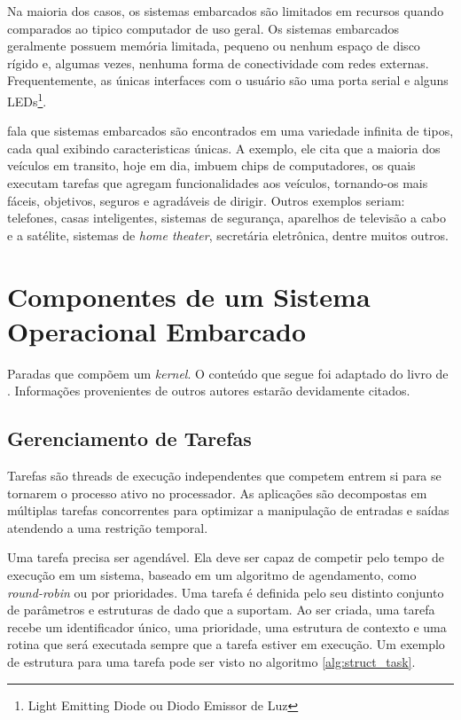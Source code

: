Na maioria dos casos, os sistemas embarcados são limitados em recursos quando comparados ao tipico computador de uso geral. Os sistemas embarcados geralmente possuem memória limitada, pequeno ou nenhum espaço de disco rígido e, algumas vezes, nenhuma forma de conectividade com redes externas. Frequentemente, as únicas interfaces com o usuário são uma porta serial e alguns LEDs\footnote{Light Emitting Diode ou Diodo Emissor de Luz}\cite{hallinan}.

 fala que sistemas embarcados são encontrados em uma variedade infinita de tipos, cada qual exibindo caracteristicas únicas. A exemplo, ele cita que a maioria dos veículos em transito, hoje em dia, imbuem chips de computadores, os quais executam tarefas que agregam funcionalidades aos veículos, tornando-os mais fáceis, objetivos, seguros e agradáveis de dirigir. Outros exemplos seriam: telefones, casas inteligentes, sistemas de segurança, aparelhos de televisão a cabo e a satélite, sistemas de \emph{home theater}, secretária eletrônica, dentre muitos outros.

\section{Componentes de um Sistema Operacional Embarcado}

Paradas que compõem um \emph{kernel}. O conteúdo que segue foi adaptado do livro de . Informações provenientes de outros autores estarão devidamente citados.

\subsection{Gerenciamento de Tarefas}

Tarefas são threads de execução independentes que competem entrem si para se tornarem o processo ativo no processador. As aplicações são decompostas em múltiplas tarefas concorrentes para optimizar a manipulação de entradas e saídas atendendo a uma restrição temporal.

Uma tarefa precisa ser agendável. Ela deve ser capaz de competir pelo tempo de execução em um sistema, baseado em um algoritmo de agendamento, como \emph{round-robin} ou por prioridades. Uma tarefa é definida pelo seu distinto conjunto de parâmetros e estruturas de dado que a suportam. Ao ser criada, uma tarefa recebe um identificador único, uma prioridade, uma estrutura de contexto e uma rotina que será executada sempre que a tarefa estiver em execução. Um exemplo de estrutura para uma tarefa pode ser visto no algoritmo \ref{alg:struct_task}.

